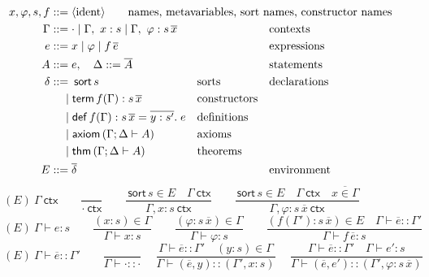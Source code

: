 \documentclass[runningheads]{llncs}
\newcommand{\ctx}{\ \mathsf{ctx}}
\newcommand{\sort}{\,\mathsf{sort}}
\begin{document}
\begin{figure}
  \begin{align*}
    x,\varphi,s,f::={}&\langle\mbox{ident}\rangle \qquad\rlap{\mbox{names, metavariables, sort names, constructor names}}\\
    \Gamma::={}&\cdot\mid\Gamma,\ x:s\mid\Gamma,\ \varphi:s\,\overline{x}&&\mbox{contexts}\\
    e::={}&x\mid \varphi\mid f\,\overline{e}&&\mbox{expressions}\\
    A::={}&e,\quad \Delta::=\overline{A}&&\mbox{statements}\\
    \delta::={}&\!\!\!\!\begin{aligned}[t]
      &\sort\,s&&\mbox{sorts}\\
      \mid {}&\mathsf{term}\,f(\Gamma):s\,\overline{x}&&\mbox{constructors}\\
      \mid {}&\mathsf{def}\,f(\Gamma):s\,\overline{x}=\overline{y:s'}.\;e&&\mbox{definitions}\\
      \mid {}&\mathsf{axiom}\,(\Gamma;\Delta\vdash A)&&\mbox{axioms}\\
      \mid {}&\mathsf{thm}\,(\Gamma;\Delta\vdash A)&&\mbox{theorems}
    \end{aligned}&&\mbox{declarations}\\
    E::={}&\overline{\delta}&&\mbox{environment}\\
  \end{align*}\vspace{-18pt}
  $$\boxed{(E)\ \Gamma\ctx}\qquad\dfrac{}{\cdot\ctx}\qquad
  \dfrac{\sort\,s\in E\quad \Gamma\ctx}{\Gamma,x:s\ctx}\qquad
  \dfrac{\sort\,s\in E\quad \Gamma\ctx\quad \overline{x\in\Gamma}}{\Gamma,\varphi:s\,\overline{x}\ctx}$$\vspace{3pt}
  $$\boxed{(E)\ \Gamma\vdash e:s}\qquad\dfrac{(x:s)\in \Gamma}{\Gamma\vdash x:s}\qquad
  \dfrac{(\varphi:s\,\overline{x})\in \Gamma}{\Gamma\vdash \varphi:s}\qquad
  \dfrac{(f(\Gamma'):s\,\overline{x})\in E\quad\Gamma\vdash \overline{e}::\Gamma'}{\Gamma\vdash f\,\overline{e}:s}$$\vspace{3pt}
  $$\boxed{(E)\ \Gamma\vdash \overline{e}::\Gamma'}\qquad\dfrac{}{\Gamma\vdash\cdot::\cdot}\hspace{15pt}
  \dfrac{\Gamma\vdash \overline{e}::\Gamma'\quad (y:s)\in\Gamma}{\Gamma\vdash (\overline{e},y)::(\Gamma',x:s)}\hspace{15pt}
  \dfrac{\Gamma\vdash \overline{e}::\Gamma'\quad \Gamma\vdash e':s}{\Gamma\vdash (\overline{e},e')::(\Gamma',\varphi:s\,\overline{x})}$$\vspace{3pt}

\end{figure}
\end{document}
